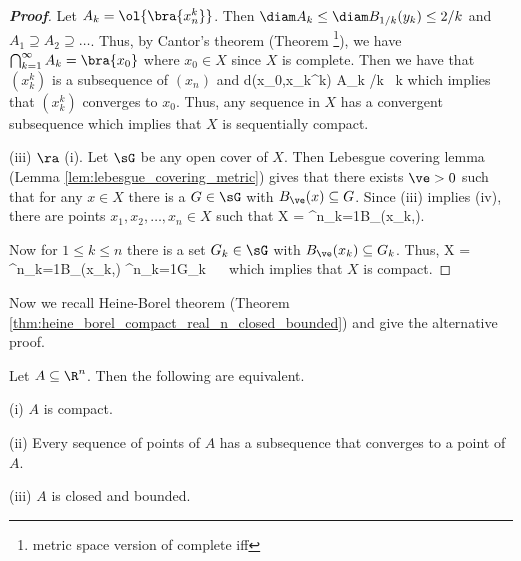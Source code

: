 \begin{proof}[\bf Proof]
Let $A_k = \ol{\bra{x_n^k}}$. Then $\diam A_k \leq \diam B_{1/k}(y_k) \leq 2/k$ and $A_1 \supseteq A_2 \supseteq \dots$. Thus, by Cantor's theorem (Theorem \footnote{metric space version of complete iff}), we have $\bigcap^\infty_{k=1} A_k = \bra{x_0}$ where $x_0\in X$ since $X$ is complete. Then we have that $(x_k^k)$ is a subsequence of $(x_n)$ and
\be
d(x_0,x_k^k) \leq \diam A_k /k \ k \to \infty
\ee
which implies that $(x_k^k)$ converges to $x_0$. Thus, any sequence in $X$ has a convergent subsequence which implies that $X$ is sequentially compact.

(iii) $\ra$ (i). Let $\sG$ be any open cover of $X$. Then Lebesgue covering lemma (Lemma \ref{lem:lebesgue_covering_metric}) gives that there exists $\ve>0$ such that for any $x\in X$ there is a $G\in \sG$ with $B_\ve(x) \subseteq G$. Since (iii) implies (iv), there are points $x_1,x_2,\dots,x_n\in X$ such that
\be
X = \bigcup^n_{k=1}B_\ve(x_k,\ve).
\ee

Now for $1\leq k\leq n$ there is a set $G_k\in \sG$ with $B_\ve(x_k) \subseteq G_k$. Thus,
\be
X = \bigcup^n_{k=1}B_\ve(x_k,\ve) \subseteq \bigcup^n_{k=1}G_k \ \ra\ \sG
\ee
which implies that $X$ is compact.
\end{proof}



Now we recall Heine-Borel theorem (Theorem \ref{thm:heine_borel_compact_real_n_closed_bounded}) and give the alternative proof.%

\begin{theorem}\label{thm:heine_borel_compact_real_n_closed_bounded_metric_proof}
Let $A \subseteq \R^n$. Then the following are equivalent.
\ben
\item [(i)] $A$ is compact.
\item [(ii)] Every sequence of points of $A$ has a subsequence that converges to a point of $A$.
\item [(iii)] $A$ is closed and bounded.
\een
\end{theorem}

